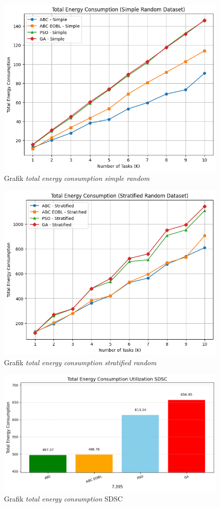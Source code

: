 \begin{figure} [H]
    \centering
    \includegraphics[width=0.75\linewidth]{gambar/Grafik Total Energy Consumption Simple Random.png}
    \caption{Grafik \textit{total energy consumption simple random}}
\end{figure}

\newpage

\begin{figure} [H]
    \centering
    \includegraphics[width=0.75\linewidth]{gambar/Grafik Total Energy Consumption Stratified Random.png}
    \caption{Grafik \textit{total energy consumption stratified random}}
\end{figure}

\begin{figure} [H]
    \centering
    \includegraphics[width=0.75\linewidth]{gambar/Grafik Total Energy Consumption SDSC.png}
    \caption{Grafik \textit{total energy consumption} SDSC}
\end{figure}

